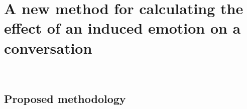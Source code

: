 \section{A new method for calculating the effect of an induced emotion on a conversation}~\label{sec:approach}

\subsection{Proposed methodology}
